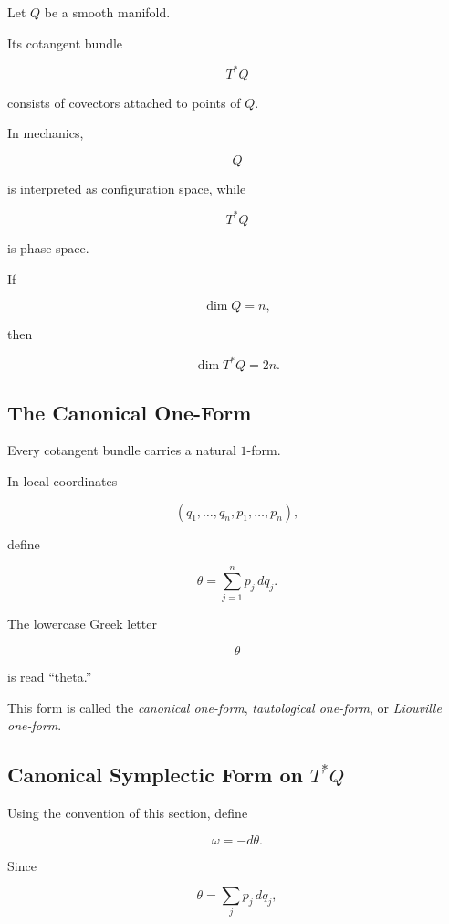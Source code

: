 Let \(Q\) be a smooth manifold.

Its cotangent bundle

\[
\boxed{
T^*Q
}
\]

consists of covectors attached to points of \(Q\).

In mechanics,

\[
Q
\]

is interpreted as configuration space, while

\[
T^*Q
\]

is phase space.

If

\[
\dim Q=n,
\]

then

\[
\boxed{
\dim T^*Q=2n.
}
\]

\subsection{The Canonical One-Form}
\label{subsec:canonical-one-form}

Every cotangent bundle carries a natural \(1\)-form.

In local coordinates

\[
(q_1,\ldots,q_n,p_1,\ldots,p_n),
\]

define

\[
\boxed{
\theta
=
\sum_{j=1}^{n}
p_j\,dq_j.
}
\]

The lowercase Greek letter

\[
\theta
\]

is read ``theta.''

This form is called the \emph{canonical one-form}, \emph{tautological
one-form}, or \emph{Liouville one-form}.

\subsection{Canonical Symplectic Form on \(T^*Q\)}
\label{subsec:canonical-cotangent-symplectic-form}

Using the convention of this section, define

\[
\boxed{
\omega=-d\theta.
}
\]

Since

\[
\theta
=
\sum_j p_j\,dq_j,
\]

